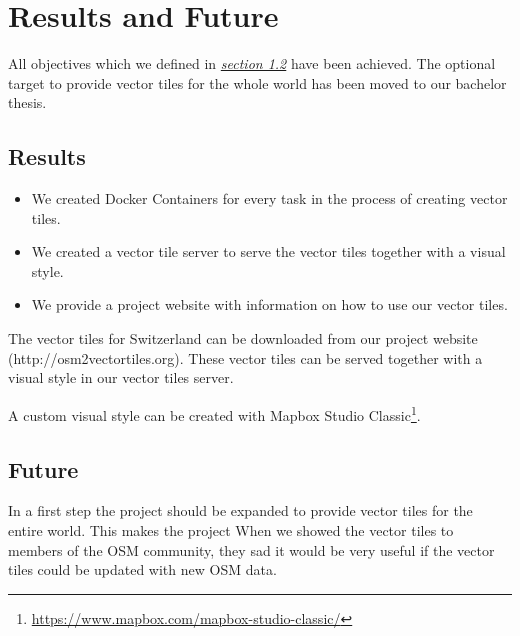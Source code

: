 \chapter{Results and Future}

All objectives which we defined in \hyperref[targets]{\emph{section 1.2}} have been achieved. The optional target to provide vector tiles for the whole world has been moved to our bachelor thesis.

\section{Results}

\begin{itemize}
\item
  We created Docker Containers for every task in the process of creating vector tiles.
\item
  We created a vector tile server to serve the vector tiles together with a visual style.
\item
  We provide a project website with information on how to use our vector tiles.
\end{itemize}

The vector tiles for Switzerland can be downloaded from our project website (http://osm2vectortiles.org). These vector tiles can be served together with a visual style in our vector tiles server.

A custom visual style can be created with Mapbox Studio Classic\footnote{\url{https://www.mapbox.com/mapbox-studio-classic/}}.

\section{Future}
In a first step the project should be expanded to provide vector tiles for the entire world. This makes the project When we showed the vector tiles to members of the OSM community, they sad it would be very useful if the vector tiles could be updated with new OSM data. 

\newpage